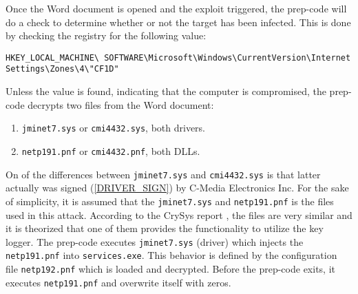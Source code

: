 \documentclass[11pt,english,a4paper]{report}
\begin{document}
Once the Word document is opened and the exploit triggered, the prep-code will do a check to determine whether or not the target has been infected. This is done by checking the registry for the following value:
\begin{lstlisting}
HKEY_LOCAL_MACHINE\ SOFTWARE\Microsoft\Windows\CurrentVersion\Internet Settings\Zones\4\"CF1D" 
\end{lstlisting}
Unless the value is found, indicating that the computer is compromised, the prep-code decrypts two files from the Word document:
 \begin{enumerate}
   \item  \texttt{jminet7.sys} or \texttt{cmi4432.sys}, both drivers.
   \item  \texttt{netp191.pnf} or \texttt{cmi4432.pnf}, both DLLs.
  \end{enumerate}
{\raggedright
On of the differences between \texttt{jminet7.sys} and \texttt{cmi4432.sys} is that latter actually was signed (\ref{DRIVER_SIGN}) by C-Media Electronics Inc. For the sake of simplicity, it is assumed that the \texttt{jminet7.sys} and \texttt{netp191.pnf} is the files used in this attack. According to the CrySys report \cite{DUQU_BUD}, the files are very similar and it is theorized that one of them provides the functionality to utilize the key logger. The prep-code executes \texttt{jminet7.sys} (driver) which injects the \texttt{netp191.pnf} into \texttt{services.exe}. This behavior is defined by the configuration file \texttt{netp192.pnf} which is loaded and decrypted. Before the prep-code exits, it executes \texttt{netp191.pnf} and overwrite itself with zeros. 
\par}
\end{document}
